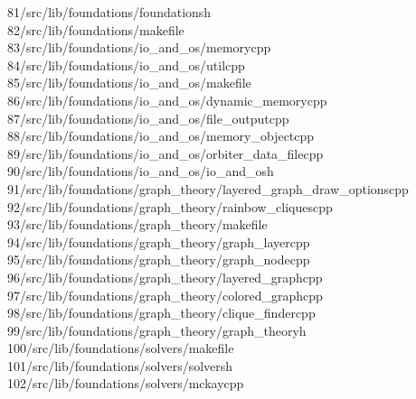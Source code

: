\begin{tabbing}
81\>/src/lib/foundations/foundationsh\\[0pt]
82\>/src/lib/foundations/makefile\\[0pt]
83\>/src/lib/foundations/io\_and\_os/memorycpp\\[0pt]
84\>/src/lib/foundations/io\_and\_os/utilcpp\\[0pt]
85\>/src/lib/foundations/io\_and\_os/makefile\\[0pt]
86\>/src/lib/foundations/io\_and\_os/dynamic\_memorycpp\\[0pt]
87\>/src/lib/foundations/io\_and\_os/file\_outputcpp\\[0pt]
88\>/src/lib/foundations/io\_and\_os/memory\_objectcpp\\[0pt]
89\>/src/lib/foundations/io\_and\_os/orbiter\_data\_filecpp\\[0pt]
90\>/src/lib/foundations/io\_and\_os/io\_and\_osh\\[0pt]
91\>/src/lib/foundations/graph\_theory/layered\_graph\_draw\_optionscpp\\[0pt]
92\>/src/lib/foundations/graph\_theory/rainbow\_cliquescpp\\[0pt]
93\>/src/lib/foundations/graph\_theory/makefile\\[0pt]
94\>/src/lib/foundations/graph\_theory/graph\_layercpp\\[0pt]
95\>/src/lib/foundations/graph\_theory/graph\_nodecpp\\[0pt]
96\>/src/lib/foundations/graph\_theory/layered\_graphcpp\\[0pt]
97\>/src/lib/foundations/graph\_theory/colored\_graphcpp\\[0pt]
98\>/src/lib/foundations/graph\_theory/clique\_findercpp\\[0pt]
99\>/src/lib/foundations/graph\_theory/graph\_theoryh\\[0pt]
100\>/src/lib/foundations/solvers/makefile\\[0pt]
101\>/src/lib/foundations/solvers/solversh\\[0pt]
102\>/src/lib/foundations/solvers/mckaycpp\\[0pt]

\end{tabbing}
